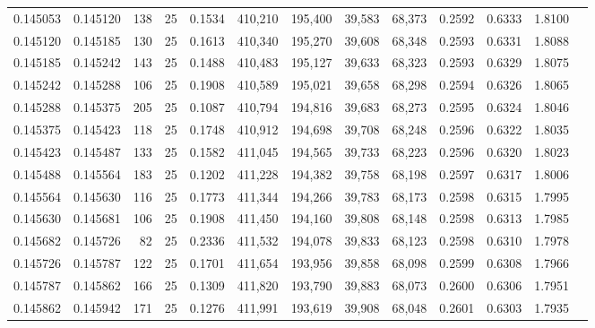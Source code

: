\begin{tabular}{rrrrrrrrrrrrr}
0.145053 & 0.145120 &   138 &  25 &                                     0.1534 & 410,210 & 195,400 &  39,583 &  68,373 & 0.2592 & 0.6333 & 1.8100 \\
0.145120 & 0.145185 &   130 &  25 &                                     0.1613 & 410,340 & 195,270 &  39,608 &  68,348 & 0.2593 & 0.6331 & 1.8088 \\
0.145185 & 0.145242 &   143 &  25 &                                     0.1488 & 410,483 & 195,127 &  39,633 &  68,323 & 0.2593 & 0.6329 & 1.8075 \\
0.145242 & 0.145288 &   106 &  25 &                                     0.1908 & 410,589 & 195,021 &  39,658 &  68,298 & 0.2594 & 0.6326 & 1.8065 \\
0.145288 & 0.145375 &   205 &  25 &                                     0.1087 & 410,794 & 194,816 &  39,683 &  68,273 & 0.2595 & 0.6324 & 1.8046 \\
0.145375 & 0.145423 &   118 &  25 &                                     0.1748 & 410,912 & 194,698 &  39,708 &  68,248 & 0.2596 & 0.6322 & 1.8035 \\
0.145423 & 0.145487 &   133 &  25 &                                     0.1582 & 411,045 & 194,565 &  39,733 &  68,223 & 0.2596 & 0.6320 & 1.8023 \\
0.145488 & 0.145564 &   183 &  25 &                                     0.1202 & 411,228 & 194,382 &  39,758 &  68,198 & 0.2597 & 0.6317 & 1.8006 \\
0.145564 & 0.145630 &   116 &  25 &                                     0.1773 & 411,344 & 194,266 &  39,783 &  68,173 & 0.2598 & 0.6315 & 1.7995 \\
0.145630 & 0.145681 &   106 &  25 &                                     0.1908 & 411,450 & 194,160 &  39,808 &  68,148 & 0.2598 & 0.6313 & 1.7985 \\
0.145682 & 0.145726 &    82 &  25 &                                     0.2336 & 411,532 & 194,078 &  39,833 &  68,123 & 0.2598 & 0.6310 & 1.7978 \\
0.145726 & 0.145787 &   122 &  25 &                                     0.1701 & 411,654 & 193,956 &  39,858 &  68,098 & 0.2599 & 0.6308 & 1.7966 \\
0.145787 & 0.145862 &   166 &  25 &                                     0.1309 & 411,820 & 193,790 &  39,883 &  68,073 & 0.2600 & 0.6306 & 1.7951 \\
0.145862 & 0.145942 &   171 &  25 &                                     0.1276 & 411,991 & 193,619 &  39,908 &  68,048 & 0.2601 & 0.6303 & 1.7935 \\

\end{tabular}
